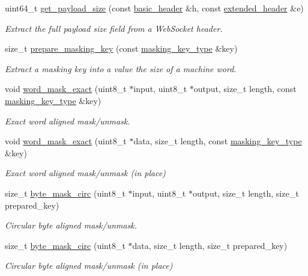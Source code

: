 \begin{DoxyCompactItemize}
uint64\+\_\+t \hyperlink{namespacewebsocketpp_1_1frame_a2ca0b9ba6077f201997da543d45b067f}{get\+\_\+payload\+\_\+size} (const \hyperlink{structwebsocketpp_1_1frame_1_1basic__header}{basic\+\_\+header} \&h, const \hyperlink{structwebsocketpp_1_1frame_1_1extended__header}{extended\+\_\+header} \&e)
\begin{DoxyCompactList}\small\item\em Extract the full payload size field from a Web\+Socket header. \end{DoxyCompactList}\item 
size\+\_\+t \hyperlink{namespacewebsocketpp_1_1frame_af80eee705eb39fb533cf4ab3d7a6d3bb}{prepare\+\_\+masking\+\_\+key} (const \hyperlink{namespacewebsocketpp_1_1frame_a8bdac8ec44c78c027fcf55aa3bad3f86}{masking\+\_\+key\+\_\+type} \&key)
\begin{DoxyCompactList}\small\item\em Extract a masking key into a value the size of a machine word. \end{DoxyCompactList}\item 
void \hyperlink{namespacewebsocketpp_1_1frame_acb2ccda66981a8a12a3b97fb4b179aa3}{word\+\_\+mask\+\_\+exact} (uint8\+\_\+t $\ast$input, uint8\+\_\+t $\ast$output, size\+\_\+t length, const \hyperlink{namespacewebsocketpp_1_1frame_a8bdac8ec44c78c027fcf55aa3bad3f86}{masking\+\_\+key\+\_\+type} \&key)
\begin{DoxyCompactList}\small\item\em Exact word aligned mask/unmask. \end{DoxyCompactList}\item 
void \hyperlink{namespacewebsocketpp_1_1frame_ab5cb468072d1f3f4b430eb2e0baff69d}{word\+\_\+mask\+\_\+exact} (uint8\+\_\+t $\ast$data, size\+\_\+t length, const \hyperlink{namespacewebsocketpp_1_1frame_a8bdac8ec44c78c027fcf55aa3bad3f86}{masking\+\_\+key\+\_\+type} \&key)
\begin{DoxyCompactList}\small\item\em Exact word aligned mask/unmask (in place) \end{DoxyCompactList}\item 
size\+\_\+t \hyperlink{namespacewebsocketpp_1_1frame_a3e0ba89b475df758d84dab352a76c3b3}{byte\+\_\+mask\+\_\+circ} (uint8\+\_\+t $\ast$input, uint8\+\_\+t $\ast$output, size\+\_\+t length, size\+\_\+t prepared\+\_\+key)
\begin{DoxyCompactList}\small\item\em Circular byte aligned mask/unmask. \end{DoxyCompactList}\item 
size\+\_\+t \hyperlink{namespacewebsocketpp_1_1frame_a5e0b4f532f0d309a605e232cfdb03960}{byte\+\_\+mask\+\_\+circ} (uint8\+\_\+t $\ast$data, size\+\_\+t length, size\+\_\+t prepared\+\_\+key)
\begin{DoxyCompactList}\small\item\em Circular byte aligned mask/unmask (in place) \end{DoxyCompactList}\end{DoxyCompactItemize}



